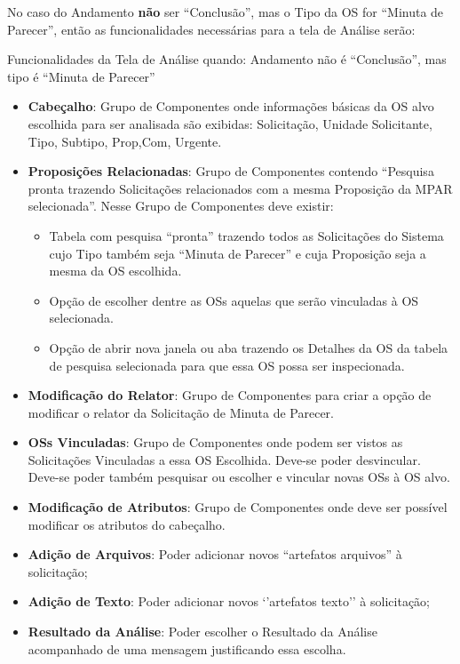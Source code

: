 No caso do Andamento \textbf{não} ser ``Conclusão'', mas o Tipo da OS for ``Minuta de Parecer'', então as funcionalidades necessárias para a tela de Análise serão:

\begin{nota}[1]{Funcionalidades da Tela de Análise quando: Andamento não é ``Conclusão'', mas tipo é ``Minuta de Parecer''}
	\begin{itemize}
		\item \textbf{Cabeçalho}: Grupo de Componentes onde informações básicas da OS alvo escolhida para ser analisada são exibidas: Solicitação, Unidade Solicitante, Tipo, Subtipo, Prop,Com, Urgente.
		
		\item \textbf{Proposições Relacionadas}: Grupo de Componentes contendo ``Pesquisa pronta trazendo Solicitações relacionados com a mesma Proposição da MPAR selecionada''. Nesse Grupo de Componentes deve existir:
		
		\begin{itemize}
			\item Tabela com pesquisa ``pronta'' trazendo todos as Solicitações do Sistema cujo Tipo também seja ``Minuta de Parecer'' e cuja Proposição seja a mesma da OS escolhida. 
			\item Opção de escolher dentre as OSs aquelas que serão vinculadas à OS selecionada.
			\item Opção de abrir nova janela ou aba trazendo os Detalhes da OS da tabela de pesquisa selecionada para que essa OS possa ser inspecionada.			
		\end{itemize}			

		\item \textbf{Modificação do Relator}: Grupo de Componentes para criar a opção de modificar o relator da Solicitação de Minuta de Parecer.

		\item \textbf{OSs Vinculadas}: Grupo de Componentes onde podem ser vistos as Solicitações Vinculadas a essa OS Escolhida. Deve-se poder desvincular. Deve-se poder também pesquisar ou escolher e vincular novas OSs à OS alvo.	

		\item \textbf{Modificação de Atributos}: Grupo de Componentes onde deve ser possível modificar os atributos do cabeçalho.

		\item \textbf{Adição de Arquivos}: Poder adicionar novos ``artefatos arquivos'' à solicitação;
		\item \textbf{Adição de Texto}: Poder adicionar novos `'artefatos texto'' à solicitação;

		\item \textbf{Resultado da Análise}: Poder escolher o Resultado da Análise acompanhado de uma mensagem justificando essa escolha.		
	\end{itemize}
\end{nota}



